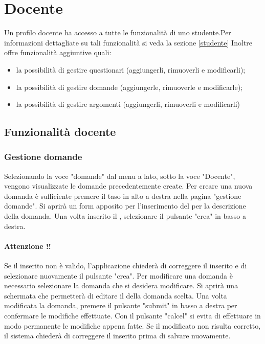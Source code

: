 \documentclass[12pt,a4paper]{article}
\begin{document}
	\section{Docente}\label{docente}
	Un profilo docente ha accesso a tutte le funzionalità di uno studente.Per informazioni dettagliate su tali funzionalità si veda la sezione \ref{studente}
		Inoltre offre funzionalità aggiuntive quali:
		\begin{itemize}
			\item la possibilità di gestire questionari (aggiungerli, rimuoverli e modificarli);
			\item la possibilità di gestire domande (aggiungerle, rimuoverle e modificarle);
			\item la possibilità di gestire argomenti (aggiungerli, rimuoverli e modificarli)
		\end{itemize}
	\subsection{Funzionalità docente}
	
    \subsubsection{Gestione domande}

    Selezionando la voce "domande" dal menu a lato, sotto la voce "Docente", vengono visualizzate le domande precedentemente create. 
	Per creare una nuova domanda è sufficiente premere il taso in alto a destra nella pagina "gestione domande". 
	Si aprirà un form apposito per l'inserimento del  per la descrizione della domanda.
	Una volta inserito il , selezionare il pulsante "crea" in basso a destra.
	
	\paragraph{Attenzione !!}Se il  inserito non è valido, l'applicazione chiederà di correggere il  inserito e di selezionare nuovamente il pulsante "crea".
	Per modificare una domanda è necessario selezionare la domanda che si desidera modificare. Si aprirà una schermata che permetterà di editare il  della domanda scelta.
	Una volta modificata la domanda, premere il pulsante "submit" in basso a destra per confermare le modifiche effettuate. Con il pulsante "calcel" si evita di effettuare in modo permanente le modifiche appena fatte.
	Se il  modificato non risulta corretto, il sistema chiederà di correggere il  inserito prima di salvare nuovamente.
	
\end{document}

